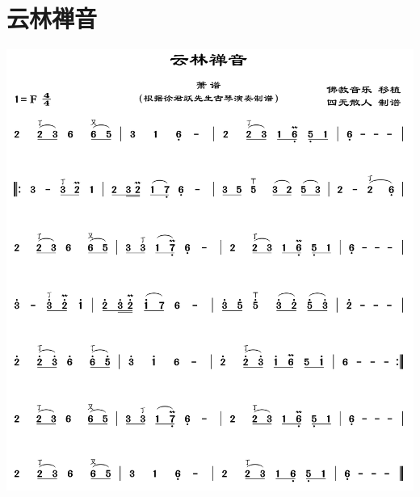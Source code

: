 \documentclass[cn,pad,twocol]{elegantbook}
\begin{document}
\section{云林禅音}\includegraphics[width=\textwidth]{rpi400/20210124云林禅音.png}
\end{document}

